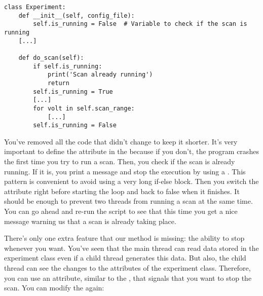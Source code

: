 \begin{verbatim}
class Experiment:
    def __init__(self, config_file):
        self.is_running = False  # Variable to check if the scan is running
    [...]

    def do_scan(self):
        if self.is_running:
            print('Scan already running')
            return
        self.is_running = True
        [...]
        for volt in self.scan_range:
            [...]
        self.is_running = False
\end{verbatim}

You've removed all the code that didn't change to keep it shorter. It's very important to define the  attribute in the  because if you don't, the program crashes the first time you try to run a scan. Then, you check if the scan is already running. If it is, you print a message and stop the execution by using a . This pattern is convenient to avoid using a very long if-else block. Then you switch the attribute right before starting the loop and back to false when it finishes. It should be enough to prevent two threads from running a scan at the same time. You can go ahead and re-run the script to see that this time you get a nice message warning us that a scan is already taking place.


There's only one extra feature that our  method is missing: the ability to stop whenever you want. You've seen that the main thread can read data stored in the experiment class even if a child thread generates this data. But also, the child thread can see the changes to the attributes of the experiment class. Therefore, you can use an attribute, similar to the , that signals that you want to stop the scan. You can modify the  again:

